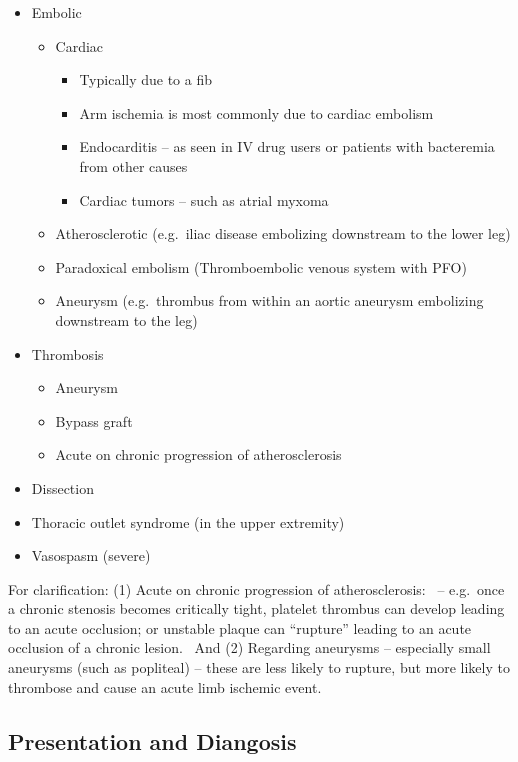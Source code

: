 \documentclass[
]{book}
\begin{document}
\begin{itemize}
\item
  Embolic

  \begin{itemize}
  \item
    Cardiac

    \begin{itemize}
    \item
      Typically due to a fib
    \item
      Arm ischemia is most commonly due to cardiac embolism~
    \item
      Endocarditis -- as seen in IV drug users or patients with
      bacteremia from other causes
    \item
      Cardiac tumors -- such as atrial myxoma
    \end{itemize}
  \item
    Atherosclerotic (e.g.~iliac disease embolizing downstream to the
    lower leg)
  \item
    Paradoxical embolism (Thromboembolic venous system with PFO)~
  \item
    Aneurysm (e.g.~thrombus from within an aortic aneurysm
    embolizing downstream to the leg)
  \end{itemize}
\item
  Thrombosis

  \begin{itemize}
  \item
    Aneurysm
  \item
    Bypass graft
  \item
    Acute on chronic progression of atherosclerosis
  \end{itemize}
\item
  Dissection
\item
  Thoracic outlet syndrome (in the upper extremity)
\item
  Vasospasm (severe)
\end{itemize}

For clarification: (1) Acute on chronic progression of atherosclerosis:~
-- e.g.~once a chronic stenosis becomes critically tight, platelet
thrombus can develop leading to an acute occlusion; or unstable plaque
can ``rupture'' leading to an acute occlusion of a chronic lesion.~ And
(2) Regarding aneurysms -- especially small aneurysms (such as
popliteal) -- these are less likely to rupture, but more likely to
thrombose and cause an acute limb ischemic event.

\hypertarget{presentation-and-diangosis}{%
\subsection{Presentation and Diangosis}\label{presentation-and-diangosis}}
\end{document}
